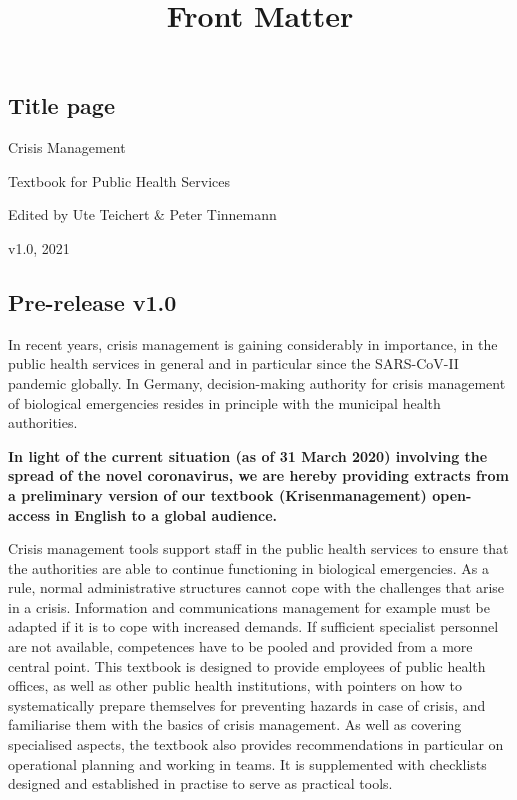 \documentclass{article}
\begin{document}
\title{Front Matter}

\maketitle


\subsection{Title page}\label{H353005}



Crisis Management


Textbook for Public Health Services


Edited by Ute Teichert \& Peter Tinnemann


v1.0, 2021


\subsection{Pre-release v1.0}\label{H6627615}



In recent years, crisis management is gaining considerably in importance, in the public health services in general and in particular since the SARS-CoV-II pandemic globally. In Germany, decision-making authority for crisis management of biological emergencies resides in principle with the municipal health authorities.


\textbf{In light of the current situation (as of 31 March 2020) involving the spread of the novel coronavirus, we are hereby providing extracts from a preliminary version of our textbook (Krisenmanagement) open-access in English to a global audience.}


Crisis management tools support staff in the public health services to ensure that the authorities are able to continue functioning in biological emergencies. As a rule, normal administrative structures cannot cope with the challenges that arise in a crisis. Information and communications management for example must be adapted if it is to cope with increased demands. If sufficient specialist personnel are not available, competences have to be pooled and provided from a more central point. This textbook is designed to provide employees of public health offices, as well as other public health institutions, with pointers on how to systematically prepare themselves for preventing hazards in case of crisis, and familiarise them with the basics of crisis management. As well as covering specialised aspects, the textbook also provides recommendations in particular on operational planning and working in teams. It is supplemented with checklists designed and established in practise to serve as practical tools.
\end{document}
